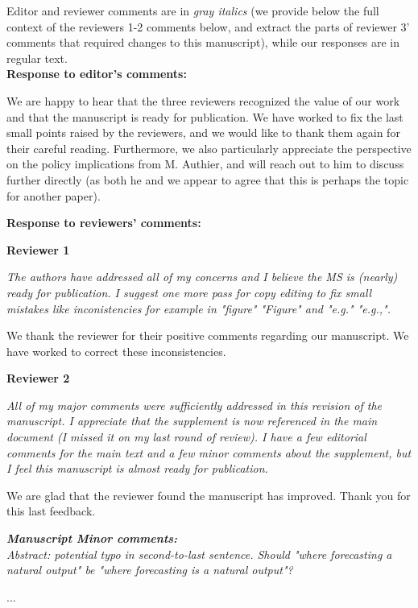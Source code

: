 \documentclass[11pt,letter]{article}
\begin{document}
\setlength{\parindent}{0cm}
\setlength{\parskip}{7pt}

Editor and reviewer comments are in \emph{gray italics} (we provide below the full context of the reviewers 1-2 comments below, and extract the parts of reviewer 3' comments that required changes to this manuscript), while our responses are in regular text. \\ 

{\bf Response to editor's comments:} 

We are happy to hear that the three reviewers recognized the value of our work and that the manuscript is ready for publication. We have worked to fix the last small points raised by the reviewers, and we would like to thank them again for their careful reading. Furthermore, we also particularly appreciate the perspective on the policy implications from M. Authier, and will reach out to him to discuss further directly (as both he and we appear to agree that this is perhaps the topic for another paper). 

{\bf Response to reviewers' comments:} 

{\bf Reviewer 1}

\begin{mybox}
\emph{The authors have addressed all of my concerns and I believe the MS is
(nearly) ready for publication. I suggest one more pass for copy editing
to fix small mistakes like inconistencies for example in "figure"
"Figure" and "e.g." "e.g.,".}
\end{mybox}

We thank the reviewer for their positive comments regarding our manuscript. 
We have worked to correct these inconsistencies.

{\bf Reviewer 2}

\begin{mybox}
\emph{All of my major comments were sufficiently addressed in this revision of
the manuscript. I appreciate that the supplement is now referenced in
the main document (I missed it on my last round of review). I have a few
editorial comments for the main text and a few minor comments about the
supplement, but I feel this manuscript is almost ready for publication.}
\end{mybox}

We are glad that the reviewer found the manuscript has improved.
Thank you for this last feedback. 

\begin{mybox}
\emph{\textbf{Manuscript Minor comments:}\\
Abstract: potential typo in second-to-last sentence. Should "where
forecasting a natural output" be "where forecasting is a natural output"?}
\end{mybox}
...
\end{document}
